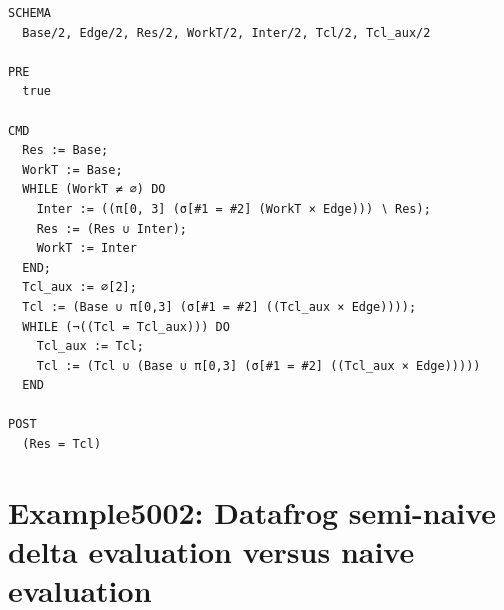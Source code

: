 \documentclass[10pt]{article}
\begin{document}
\begin{Verbatim}[fontsize=\scriptsize,breaklines=true,breakanywhere=true,frame=single,framesep=1.5mm]
SCHEMA
  Base/2, Edge/2, Res/2, WorkT/2, Inter/2, Tcl/2, Tcl_aux/2

PRE
  true 

CMD
  Res := Base;
  WorkT := Base;
  WHILE (WorkT ≠ ∅) DO
    Inter := ((π[0, 3] (σ[#1 = #2] (WorkT × Edge))) ∖ Res);
    Res := (Res ∪ Inter);
    WorkT := Inter
  END;
  Tcl_aux := ∅[2];
  Tcl := (Base ∪ π[0,3] (σ[#1 = #2] ((Tcl_aux × Edge))));
  WHILE (¬((Tcl = Tcl_aux))) DO
    Tcl_aux := Tcl;
    Tcl := (Tcl ∪ (Base ∪ π[0,3] (σ[#1 = #2] ((Tcl_aux × Edge)))))
  END

POST
  (Res = Tcl)
\end{Verbatim}

\Needspace{0.45\textheight}

\section{Example5002: Datafrog semi-naive delta evaluation versus naive evaluation}\label{case:Example5002}
\end{document}
